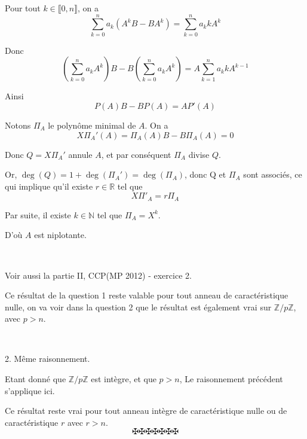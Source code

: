 Pour tout $k \in \llbracket 0, n \rrbracket$, on a
\[ \sum_{k = 0}^n a_k (A^k B - BA^k) = \sum_{k = 0}^n a_k kA^k \]


Donc
\[ \left( \sum_{k = 0}^n a_k A^k \right) B - B \left( \sum_{k = 0}^n a_k A^k
   \right) = A \sum_{k = 1}^n a_k kA^{k - 1} \]


Ainsi
\[ P (A) B - BP (A) = AP' (A) \]


Notons $\Pi_A$ le polyn{\^o}me minimal de $A$. On a
\[ X \Pi_A' (A) = \Pi_A (A) B - B \Pi_A (A) = 0 \]


Donc $Q = X \Pi_A'$ annule $A$, et par cons{\'e}quent $\Pi_A$ divise $Q$.

Or, $\deg (Q) = 1 + \deg (\Pi_A') = \deg (\Pi_A)$, donc Q et $\Pi_A$ sont
associ{\'e}s, ce qui implique qu'il existe $r \in \mathbb{R}$ tel que
\[ X \Pi'_A = r \Pi_A \]


Par suite, il existe $k \in \mathbb{N}$ tel que $\Pi_A = X^k$.

D'o{\`u} $A$ est niplotante.

\


Voir aussi la partie II, CCP(MP 2012) - exercice 2.

Ce r{\'e}sultat de la question 1 reste valable pour tout anneau de
caract{\'e}ristique nulle, on va voir dans la question 2 que le r{\'e}sultat
est {\'e}galement vrai sur $\mathbb{Z}/ p\mathbb{Z}$, avec $p > n$.

\

2. M{\^e}me raisonnement.

Etant donn{\'e} que $\mathbb{Z}/ p\mathbb{Z}$ est int{\`e}gre, et que $p > n$,
Le raisonnement pr{\'e}c{\'e}dent s'applique ici.

Ce r{\'e}sultat reste vrai pour tout anneau int{\`e}gre de caract{\'e}ristique
nulle ou de caract{\'e}ristique $r$ avec $r > n$.
\[ \maltese \maltese \maltese \maltese \maltese \maltese \maltese \]
